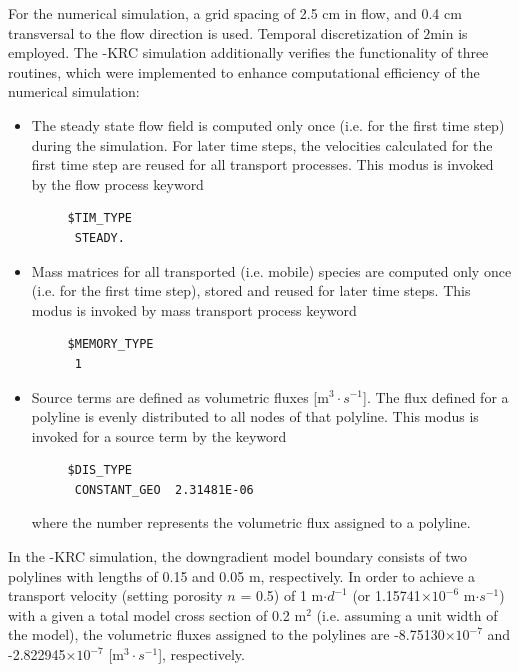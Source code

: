 For the numerical simulation, a grid spacing of 2.5 cm in flow, and 0.4 cm
transversal to the flow direction is used. Temporal discretization of $2\mathrm{min}$ is employed. The \GeoSys-KRC simulation additionally verifies the functionality of three routines, which were implemented to enhance computational efficiency of the numerical simulation:
\begin{itemize}
 \item The steady state flow field is computed only once (i.e. for the first time step) during the simulation. For later time steps, the velocities calculated for the first time step are reused for all transport processes. This modus is invoked by the flow process keyword
     \small \begin{verbatim}
     $TIM_TYPE
      STEADY.
     \end{verbatim} \normalsize
\item  Mass matrices for all transported (i.e. mobile) species are computed only once (i.e. for the first time step), stored and reused for later time steps. This modus is invoked by mass transport process keyword
     \small \begin{verbatim}
     $MEMORY_TYPE
      1
     \end{verbatim} \normalsize
\item  Source terms are defined as volumetric fluxes [m$^3 \cdot s^{-1}$]. The flux defined for a polyline is evenly distributed to all nodes of that polyline. This modus is invoked for a source term by the keyword
     \small \begin{verbatim}
     $DIS_TYPE
      CONSTANT_GEO  2.31481E-06
     \end{verbatim} \normalsize
     where the number represents the volumetric flux assigned to a polyline.
\end{itemize}
In the \GeoSys-KRC simulation, the downgradient model boundary consists of two polylines with lengths of 0.15 and 0.05 m, respectively. In order to achieve a transport velocity (setting porosity $n$ = 0.5) of 1 m$\cdot d^{-1}$ (or 1.15741$\times10^{-6}$ m$\cdot s^{-1}$) with a given a total model cross section of 0.2 m$^2$ (i.e. assuming a unit width of the model), the volumetric fluxes assigned to the polylines are -8.75130$\times10^{-7}$ and -2.822945$\times10^{-7}$ [m$^3 \cdot s^{-1}$], respectively.



